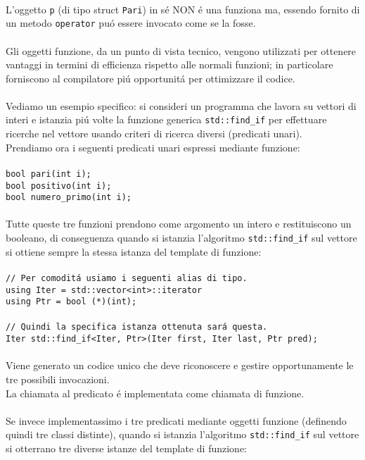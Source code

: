 \documentclass{article}
\begin{document}
 \\ L'oggetto \texttt{p} (di tipo struct \texttt{Pari}) in s\'e NON \'e una funziona ma, essendo fornito di un metodo \texttt{operator{}} pu\'o essere invocato come se la fosse.\\ \\Gli oggetti funzione, da un punto di vista tecnico, vengono utilizzati per ottenere vantaggi in termini di efficienza rispetto alle normali funzioni; in particolare forniscono al compilatore pi\'u opportunit\'a per ottimizzare il codice.\\
\\Vediamo un esempio specifico: si consideri un programma che lavora su vettori di interi e istanzia pi\'u volte la funzione generica \texttt{std::find\_if} per effettuare ricerche nel vettore usando criteri di ricerca diversi (predicati unari).\\Prendiamo ora i seguenti predicati unari espressi mediante funzione:\\ \\
\texttt{bool pari(int i);\\bool positivo(int i);\\bool numero\_primo(int i);} \\ 
\\ Tutte queste tre funzioni prendono come argomento un intero e restituiscono un booleano, di conseguenza quando si istanzia l'algoritmo \texttt{std::find\_if} sul vettore si ottiene sempre la stessa istanza del template di funzione:\\ \\
\texttt{\textcolor{grigio}{// Per comodit\'a usiamo i seguenti alias di tipo. }\\ using Iter = std::vector<int>::iterator \\ using Ptr = bool (*)(int); \\ \\ \textcolor{grigio}{// Quindi la specifica istanza ottenuta sar\'a questa. }\\ Iter std::find\_if<Iter, Ptr>(Iter first, Iter last, Ptr pred);} \\ \\ Viene generato un codice unico che deve riconoscere e gestire opportunamente le tre possibili invocazioni.\\La chiamata al predicato \'e implementata come chiamata di funzione.\\ \\Se invece implementassimo i tre predicati mediante oggetti funzione (definendo quindi tre classi distinte), quando si istanzia l'algoritmo \texttt{std::find\_if} sul vettore si otterrano tre diverse istanze del template di funzione: \\ \\
\end{document}
